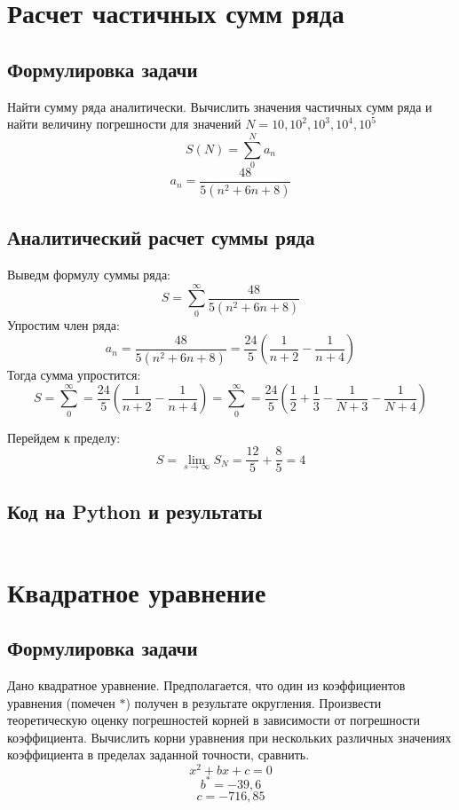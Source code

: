 \documentclass[a4paper,12pt]{article}
\newenvironment{longlisting}{\captionsetup{type=listing}}{}
\begin{document}
\tableofcontents

\section{Расчет частичных сумм ряда}
\subsection{Формулировка задачи}
Найти сумму ряда аналитически. Вычислить значения частичных сумм ряда 
и найти величину погрешности для значений $N = 10, 10^2, 10^3, 10^4, 10^5$
   $$S(N) = \sum_0^N a_n$$
   $$a_n = \frac{48}{5(n^2 +6n + 8)}$$
   
\subsection{Аналитический расчет суммы ряда}
Выведм формулу суммы ряда:
   $$S = \sum_{0}^{\infty} \frac{48}{5(n^2 +6n + 8)}$$
Упростим член ряда:
   $$a_n =  \frac{48}{5(n^2 +6n + 8)} = \frac{24}{5}(\frac{1}{n+2} - \frac{1}{n+4})$$
Тогда сумма упростится:
   $$S = \sum_{0}^{\infty}  = \frac{24}{5}(\frac{1}{n+2} - \frac{1}{n+4}) = \sum_{0}^{\infty}  = \frac{24}{5}(\frac{1}{2} + \frac{1}{3} - \frac{1}{N+3} - \frac{1}{N+4})$$

Перейдем к пределу:
   $$S = \lim_{s\rightarrow \infty}S_N = \frac{12}{5} + \frac{8}{5} = 4$$

\subsection{Код на Python и результаты}

\begin{longlisting}
\inputminted{python}{1_4.py}
\end{longlisting}


\section{Квадратное уравнение}
\subsection{Формулировка задачи}
Дано квадратное уравнение. Предполагается, что один из коэффициентов уравнения (помечен $*$) получен в результате округления. Произвести теоретическую оценку погрешностей корней в зависимости от погрешности коэффициента. Вычислить корни уравнения при нескольких различных значениях коэффициента в пределах заданной точности, сравнить.
$$x^2+bx+c = 0$$
$$b^* = -39,6$$
$$c = -716,85 $$
    
\end{document}
